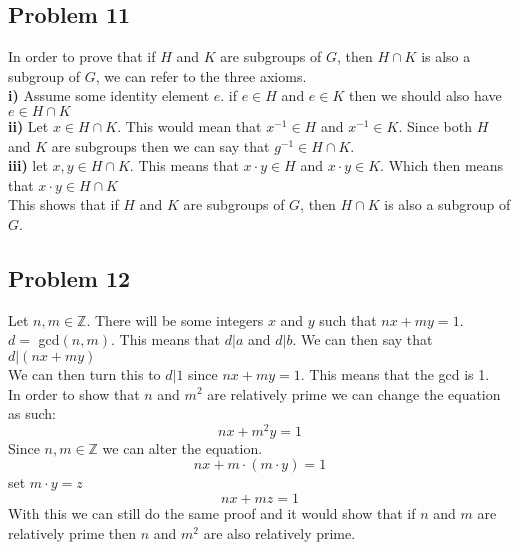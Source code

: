 \documentclass[12pt]{article}
\newcommand{\Z}{\mathbb{Z}}
\begin{document}
\subsection*{Problem 11}
In order to prove that if $H$ and $K$ are subgroups of $G$, then $H \cap K$ is also a subgroup of $G$, we can refer to the three axioms.\\
\textbf{i)} Assume some identity element $e$. if $e \in H$ and $e \in K$ then we should also have $e \in H \cap K$ \\
\textbf{ii)} Let $x \in H \cap K$. This would mean that $x^{-1} \in H$ and $x^{-1} \in K$. Since both $H$ and $K$ are subgroups then we can say that $g^{-1} \in H \cap K$. \\
\textbf{iii)} let $x,y \in H \cap K$. This means that $x \cdot y \in H$ and $x \cdot y \in K$. Which then means that $x \cdot y \in H \cap K$\\
This shows that if $H$ and $K$ are subgroups of $G$, then $H \cap K$ is also a subgroup of $G$.
\newpage
\subsection*{Problem 12}
Let $n,m \in \Z$. There will be some integers $x$ and $y$ such that $nx + my = 1$.\\
$d =$ gcd$(n,m)$. This means that $d|a$ and $d|b$. We can then say that $d|(nx + my)$\\
We can then turn this to $d|1$ since $nx + my = 1$. This means that the gcd is 1. \\
In order to show that $n$ and $m^2$ are relatively prime we can change the equation as such:
\[
	nx + m^2y = 1
\]
Since $n,m \in \Z$ we can alter the equation.
\[
	nx + m \cdot (m \cdot y) = 1
\]
set $m \cdot y = z$
\[
	nx + mz = 1
\]
With this we can still do the same proof and it would show that if $n$ and $m$ are relatively prime then $n$ and $m^2$ are also relatively prime.









\end{document}
